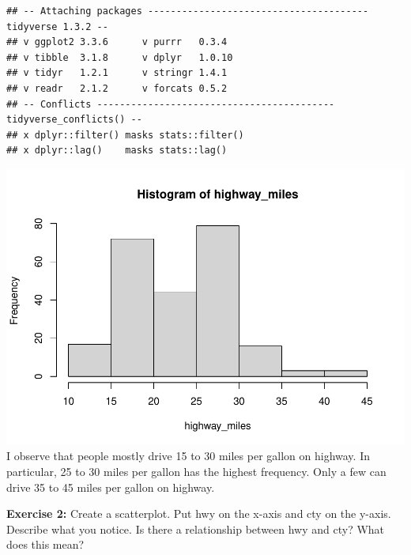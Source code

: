 \documentclass[
]{article}
\newenvironment{Shaded}{\begin{snugshade}}{\end{snugshade}}
\newcommand{\AttributeTok}[1]{\textcolor[rgb]{0.77,0.63,0.00}{#1}}
\newcommand{\FunctionTok}[1]{\textcolor[rgb]{0.00,0.00,0.00}{#1}}
\newcommand{\NormalTok}[1]{#1}
\newcommand{\OtherTok}[1]{\textcolor[rgb]{0.56,0.35,0.01}{#1}}
\newcommand{\SpecialCharTok}[1]{\textcolor[rgb]{0.00,0.00,0.00}{#1}}
\newcommand{\StringTok}[1]{\textcolor[rgb]{0.31,0.60,0.02}{#1}}
\begin{document}
\begin{verbatim}
## -- Attaching packages --------------------------------------- tidyverse 1.3.2 --
## v ggplot2 3.3.6      v purrr   0.3.4 
## v tibble  3.1.8      v dplyr   1.0.10
## v tidyr   1.2.1      v stringr 1.4.1 
## v readr   2.1.2      v forcats 0.5.2 
## -- Conflicts ------------------------------------------ tidyverse_conflicts() --
## x dplyr::filter() masks stats::filter()
## x dplyr::lag()    masks stats::lag()
\end{verbatim}

\begin{Shaded}
\end{Shaded}

\includegraphics{PSTAT131-HW1_files/figure-latex/unnamed-chunk-1-1.pdf}
I observe that people mostly drive 15 to 30 miles per gallon on highway.
In particular, 25 to 30 miles per gallon has the highest frequency. Only
a few can drive 35 to 45 miles per gallon on highway.

\textbf{Exercise 2:} Create a scatterplot. Put hwy on the x-axis and cty
on the y-axis. Describe what you notice. Is there a relationship between
hwy and cty? What does this mean?

\begin{Shaded}
\end{Shaded}
\end{document}

